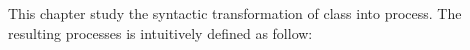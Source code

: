 This chapter study the syntactic transformation of \oz{} class into \picalc{} process. The resulting processes is intuitively defined as follow:\\

